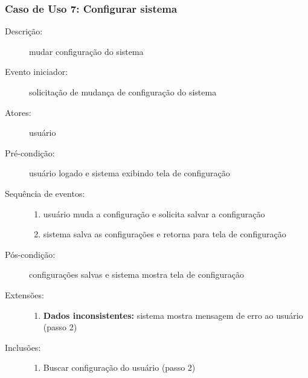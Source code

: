 \subsubsection{Caso de Uso 7: Configurar sistema}
\begin{description}
	\item[Descrição:] mudar configuração do sistema
	\item[Evento iniciador:] solicitação de mudança de configuração do sistema
	\item[Atores:] usuário
	\item[Pré-condição:] usuário logado e sistema exibindo tela de configuração
	\item[Sequência de eventos:] \hfill
		\begin{enumerate}
			\item{usuário muda a configuração e solicita salvar a configuração}
			\item{sistema salva as configurações e retorna para tela de configuração}
		\end{enumerate}
	\item[Pós-condição:] configurações salvas e sistema mostra tela de configuração
	\item[Extensões:] \hfill
		\begin{enumerate}
			\item{\textbf{Dados inconsistentes:} sistema mostra mensagem de erro ao usuário (passo 2)}
		\end{enumerate}
	\item[Inclusões:] \hfill
		\begin{enumerate}
			\item{Buscar configuração do usuário (passo 2)}
		\end{enumerate}
\end{description}
